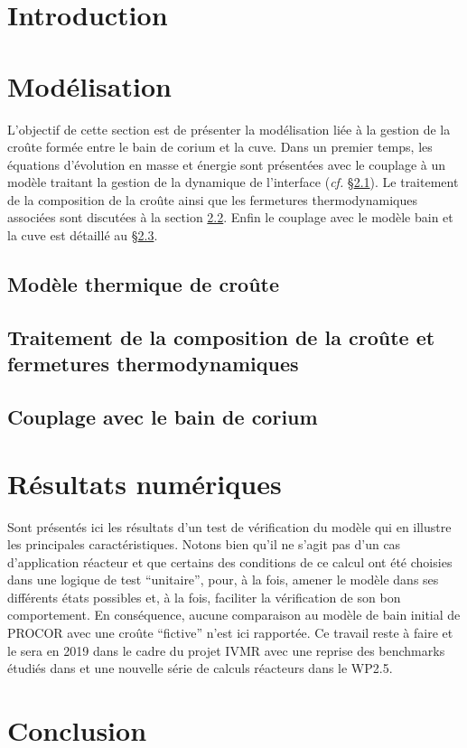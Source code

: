 \documentclass[12pt,a4paper,lmag,nt,article,french]{docDTN}
\begin{document}
\section{Introduction} \label{sect:introduction}

\section{Modélisation} \label{sect:modelisation}
L'objectif de cette section est de présenter la modélisation liée à la gestion de la croûte formée entre le bain de corium et la cuve. Dans un premier temps, les équations d'évolution en masse et énergie sont présentées avec le couplage à un modèle traitant la gestion de la dynamique de l'interface (\textit{cf.} \S \ref{sect:thermique}). Le traitement de la composition de la croûte ainsi que les fermetures thermodynamiques associées sont discutées à la section \ref{sect:thermochimie}. Enfin le couplage avec le modèle bain et la cuve est détaillé au \S \ref{sect:couplage}.
\subsection{Modèle thermique de croûte} \label{sect:thermique}

\subsection{Traitement de la composition de la croûte et fermetures thermodynamiques} \label{sect:thermochimie}

\subsection{Couplage avec le bain de corium}\label{sect:couplage}

\section{Résultats numériques} \label{sect:num}

Sont présentés ici les résultats d'un test de vérification du modèle qui en illustre les principales caractéristiques. Notons bien qu'il ne s'agit pas d'un cas d'application réacteur et que certains des conditions de ce calcul ont été choisies dans une logique de test ``unitaire'', pour, à la fois, amener le modèle dans ses différents états possibles et, à la fois, faciliter la vérification de son bon comportement. En conséquence, aucune comparaison au modèle de bain initial de PROCOR avec une croûte ``fictive'' n'est ici rapportée. Ce travail reste à faire et le sera en 2019 dans le cadre du projet IVMR avec une reprise des benchmarks étudiés dans \cite{Carenini2019} et une nouvelle série de calculs réacteurs dans le WP2.5.


\section{Conclusion} \label{sect:conclusion}




\end{document}
